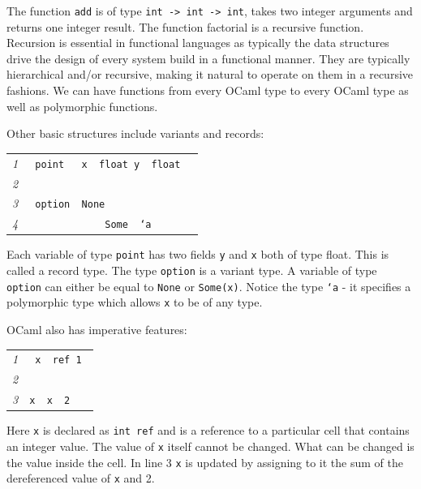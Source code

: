 \documentclass[12pt,twoside,notitlepage]{report}
\newcommand{\mlkeywordA}[1]{\mbox{\color{cyan}{\textbf{\texttt{#1}}}}}
\newcommand{\mlkeyword}[1]{\mbox{\color{red}{#1}}}
\newcommand{\mloperator}[1]{\mbox{\color{darkgreen}{#1}}}
\newcommand{\mlcodeline}[2]{\tiny\sl #1 & \begin{minipage}[c]{0.8\linewidth}\begin{alltt}\mbox{#2}\end{alltt}\end{minipage}\\}
\begin{document}
The function {\tt add} is of type {\tt int -> int -> int}, takes two integer arguments and returns one integer result. The function factorial is a recursive function. Recursion is essential in functional languages as typically the data structures drive the design of every system build in a functional manner. They are typically hierarchical and/or recursive, making it natural to operate on them in a recursive fashions. We can have functions from every OCaml type to every OCaml type as well as polymorphic functions.

Other basic structures include variants and records:



{\scriptsize\noindent\begin{longtable}{r|l}
\mlcodeline{1}{\mlkeyword{type}~point~\mlkeyword{=}~\mloperator{\{}~x~\mloperator{\mbox{\COLON}}~float\mloperator{\mbox{\SC}}~y~\mloperator{\mbox{\COLON}}~float~\mloperator{\}}
}
\mlcodeline{2}{
}
\mlcodeline{3}{\mlkeyword{type}~option~\mlkeyword{=}~None
}
\mlcodeline{4}{~~~~~~~~~~~~~\mloperator{|}Some~\mlkeyword{of}~`a
}
\end{longtable}
}
Each variable of type {\tt point} has two fields {\tt y} and {\tt x} both of type float. This is called a record type. The type {\tt option} is a variant type. A variable of type {\tt option} can either be equal to {\tt None} or {\tt Some(x)}. Notice the type {\tt `a} - it specifies a polymorphic type which allows {\tt x} to be of any type.

OCaml also has imperative features:



{\scriptsize\noindent\begin{longtable}{r|l}
\mlcodeline{1}{\mlkeywordA{let}~x~\mlkeyword{=}~ref~1
}
\mlcodeline{2}{
}
\mlcodeline{3}{x~\mloperator{\mbox{\COLON}{}=}~\mloperator{\mbox{}\hspace{0pt}{!}\hspace{0pt}}x~\mloperator{+}~2~
}
\end{longtable}
}

Here {\tt x} is declared as {\tt int ref} and is a reference to a particular cell that contains an integer value. The value of {\tt x} itself cannot be changed. What can be changed is the value inside the cell. In line 3 {\tt x} is updated by assigning to it the sum of the dereferenced value of {\tt x} and 2.  
\end{document}
